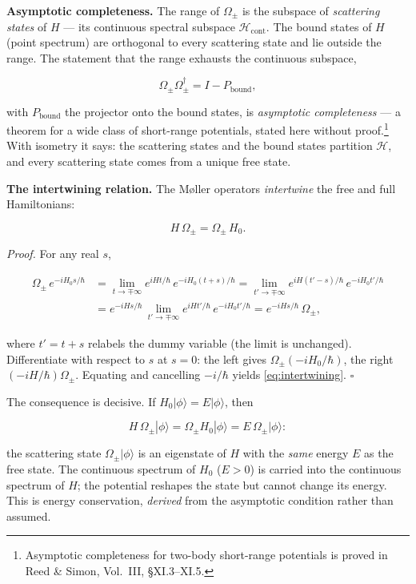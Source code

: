 \medskip\noindent\textbf{Asymptotic completeness.} The range of $\Omega_{\pm}$ is the subspace of \emph{scattering states} of $H$ --- its continuous spectral subspace $\mathcal{H}_{\mathrm{cont}}$. The bound states of $H$ (point spectrum) are orthogonal to every scattering state and lie outside the range. The statement that the range exhausts the continuous subspace,
\begin{linenomath}
\begin{equation*}
\Omega_{\pm}\Omega_{\pm}^{\dagger} = I - P_{\mathrm{bound}},
\end{equation*}
\end{linenomath}
with $P_{\mathrm{bound}}$ the projector onto the bound states, is \emph{asymptotic completeness} --- a theorem for a wide class of short-range potentials, stated here without proof.\footnote{Asymptotic completeness for two-body short-range potentials is proved in Reed \& Simon, Vol.~III, \S XI.3--XI.5.} With isometry it says: the scattering states and the bound states partition $\mathcal{H}$, and every scattering state comes from a unique free state.

\medskip\noindent\textbf{The intertwining relation.} The M\o{}ller operators \emph{intertwine} the free and full Hamiltonians:
\begin{linenomath}
\begin{equation}
H\,\Omega_{\pm} = \Omega_{\pm}\,H_{0}.
\label{eq:intertwining}
\end{equation}
\end{linenomath}
\emph{Proof.} For any real $s$,
\begin{linenomath}
\begin{align*}
\Omega_{\pm}\,e^{-iH_{0}s/\hbar}
&= \lim_{t\to\mp\infty} e^{iHt/\hbar}\,e^{-iH_{0}(t+s)/\hbar}
= \lim_{t'\to\mp\infty} e^{iH(t'-s)/\hbar}\,e^{-iH_{0}t'/\hbar}\\
&= e^{-iHs/\hbar}\,\lim_{t'\to\mp\infty} e^{iHt'/\hbar}\,e^{-iH_{0}t'/\hbar}
= e^{-iHs/\hbar}\,\Omega_{\pm},
\end{align*}
\end{linenomath}
where $t'=t+s$ relabels the dummy variable (the limit is unchanged). Differentiate with respect to $s$ at $s=0$: the left gives $\Omega_{\pm}(-iH_{0}/\hbar)$, the right $(-iH/\hbar)\Omega_{\pm}$. Equating and cancelling $-i/\hbar$ yields \eqref{eq:intertwining}. $\square$

The consequence is decisive. If $H_{0}|\phi\rangle = E|\phi\rangle$, then
\begin{linenomath}
\begin{equation*}
H\,\Omega_{\pm}|\phi\rangle = \Omega_{\pm}H_{0}|\phi\rangle = E\,\Omega_{\pm}|\phi\rangle:
\end{equation*}
\end{linenomath}
the scattering state $\Omega_{\pm}|\phi\rangle$ is an eigenstate of $H$ with the \emph{same} energy $E$ as the free state. The continuous spectrum of $H_{0}$ ($E>0$) is carried into the continuous spectrum of $H$; the potential reshapes the state but cannot change its energy. This is energy conservation, \emph{derived} from the asymptotic condition rather than assumed.

